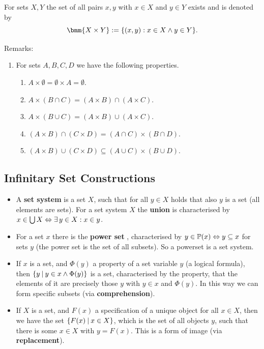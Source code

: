 \documentclass[12pt]{book}
\begin{document}
\begin{defi}\label{def:productsets}
  For sets $X, Y$ the set of all pairs $x, y$ with $x \in X$ and $y \in Y$ exists and is denoted by
  \begin{displaymath}
    \bmm{X \times Y} := \set{(x,y): x \in X \wedge y \in Y}.
  \end{displaymath}
\end{defi}
Remarks:
\begin{enumerate}
      \item For sets $A, B, C, D$ we have the following properties.
      \begin{enumerate}
            \item\label{thm:propprod5} $A \times \emptyset = \emptyset \times A = \emptyset$.
            \item\label{thm:propprod1} $A \times (B \cap C) = (A\times B) \cap (A \times C)$.
            \item\label{thm:propprod2} $A \times (B \cup C) = (A \times B) \cup (A \times C)$.
            \item\label{thm:propprod3} $(A \times B) \cap (C \times D) = (A \cap C) \times (B \cap D)$.
            \item\label{thm:propprod4} $(A \times B) \cup (C \times D) \subseteq (A \cup C) \times (B \cup D)$.
      \end{enumerate}
\end{enumerate}
\subsection{Infinitary Set Constructions}
\label{sec:Infinitary set constructions}

\begin{itemize}
      \item A \textbf{set system} is a set $X$, such that for all $y \in X$ holds that also $y$ is a set (all elements are sets). For a set system 
	  $X$ the \textbf{union}  is characterised by $x \in \bigcup X \Leftrightarrow \exists\, y \in X : x \in y$.
      \item For a set $x$ there is the \textbf{power set} , characterised by $y \in \operatorname{\mathbb{P}}(x) \Leftrightarrow y \subseteq x$ for sets $y$ (the power set 
	  is the set of all subsets). So a powerset is a set system.
      \item If $x$ is a set, and $\Phi(y)$ a property of a set variable $y$ (a logical formula), then $\{ y {\:|\:} y \in x \wedge \Phi(y) \}$ is a set, 
	  characterised by the property, that the elements of it are precisely those $y$ with $y \in x$ and $\Phi(y)$. In this way we can form specific 
	  subsets (via \textbf{comprehension}).
      \item If $X$ is a set, and $F(x)$ a specification of a unique object for all $x \in X$, then we have the set $\{ F(x) {\:|\:} x \in X \}$, which 
	  is the set of all objects $y$, such that there is some $x \in X$ with $y = F(x)$. This is a form of image (via \textbf{replacement}).
\end{itemize}
\end{document}
